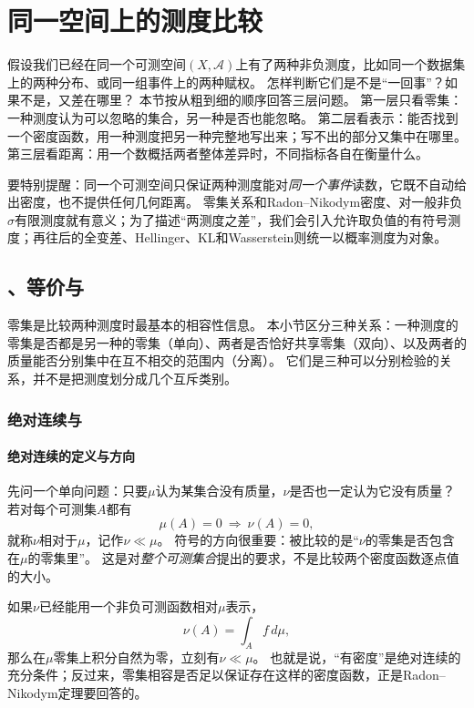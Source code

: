 \section{同一空间上的测度比较}
\label{sec:measure-same-space-comparison}

假设我们已经在同一个可测空间$(X,\mathcal A)$上有了两种非负测度，比如同一个数据集上的两种分布、或同一组事件上的两种赋权。
怎样判断它们是不是“一回事”？如果不是，又差在哪里？
本节按从粗到细的顺序回答三层问题。
第一层只看零集：一种测度认为可以忽略的集合，另一种是否也能忽略。
第二层看表示：能否找到一个密度函数，用一种测度把另一种完整地写出来；写不出的部分又集中在哪里。
第三层看距离：用一个数概括两者整体差异时，不同指标各自在衡量什么。

要特别提醒：同一个可测空间只保证两种测度能对\emph{同一个事件}读数，它既不自动给出密度，也不提供任何几何距离。
零集关系和Radon–Nikodym密度、对一般非负$\sigma$有限测度就有意义；为了描述“两测度之差”，我们会引入允许取负值的有符号测度；再往后的全变差、Hellinger、KL和Wasserstein则统一以概率测度为对象。

\subsection{、等价与}

零集是比较两种测度时最基本的相容性信息。
本小节区分三种关系：一种测度的零集是否都是另一种的零集（单向）、两者是否恰好共享零集（双向）、以及两者的质量能否分别集中在互不相交的范围内（分离）。
它们是三种可以分别检验的关系，并不是把测度划分成几个互斥类别。

\subsubsection{绝对连续与}

\paragraph{绝对连续的定义与方向}

先问一个单向问题：只要$\mu$认为某集合没有质量，$\nu$是否也一定认为它没有质量？
若对每个可测集$A$都有
\[
 \mu(A)=0\ \Longrightarrow\ \nu(A)=0,
\]
就称$\nu$相对于$\mu$，记作$\nu\ll\mu$。
符号的方向很重要：被比较的是“$\nu$的零集是否包含在$\mu$的零集里”。
这是对\emph{整个可测集合}提出的要求，不是比较两个密度函数逐点值的大小。

如果$\nu$已经能用一个非负可测函数相对$\mu$表示，
\[
 \nu(A)=\int_A f\,d\mu,
\]
那么在$\mu$零集上积分自然为零，立刻有$\nu\ll\mu$。
也就是说，“有密度”是绝对连续的充分条件；反过来，零集相容是否足以保证存在这样的密度函数，正是Radon–Nikodym定理要回答的。

